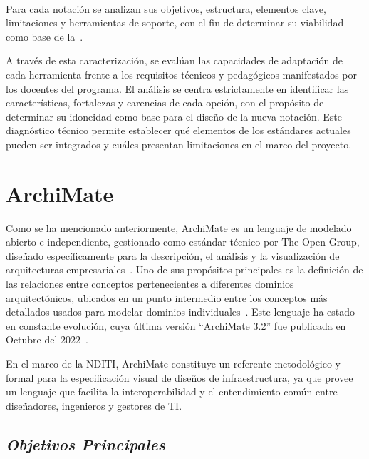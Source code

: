 \label{cap:caracterizacion-universos}
\mbox{}\\

Para cada notación se analizan sus objetivos, estructura, elementos clave, limitaciones y herramientas de soporte, con el fin de determinar su viabilidad como base de la~\NDITI.

A través de esta caracterización, se evalúan las capacidades de adaptación de cada herramienta frente a los requisitos técnicos y pedagógicos manifestados por los docentes del programa. El análisis se centra estrictamente en identificar las características, fortalezas y carencias de cada opción, con el propósito de determinar su idoneidad como base para el diseño de la nueva notación. Este diagnóstico técnico permite establecer qué elementos de los estándares actuales pueden ser integrados y cuáles presentan limitaciones en el marco del proyecto.

\section{ArchiMate}

Como se ha mencionado anteriormente, ArchiMate es un lenguaje de modelado abierto e independiente, gestionado como estándar técnico por The Open Group, diseñado específicamente para la descripción, el análisis y la visualización de arquitecturas empresariales~\cite{ArchiMate}. Uno de sus propósitos principales es la definición de las relaciones entre conceptos pertenecientes a diferentes dominios arquitectónicos, ubicados en un punto intermedio entre los conceptos más detallados usados para modelar dominios individuales~\cite{Stojanovic01}. Este lenguaje ha estado en constante evolución, cuya última versión ``ArchiMate 3.2'' fue publicada en Octubre del 2022~\cite{ArchiMate}.

En el marco de la NDITI, ArchiMate constituye un referente metodológico y formal para la especificación visual de diseños de infraestructura, ya que provee un lenguaje que facilita la interoperabilidad y el entendimiento común entre diseñadores, ingenieros y gestores de TI.


\subsection{\textit{Objetivos Principales}}

